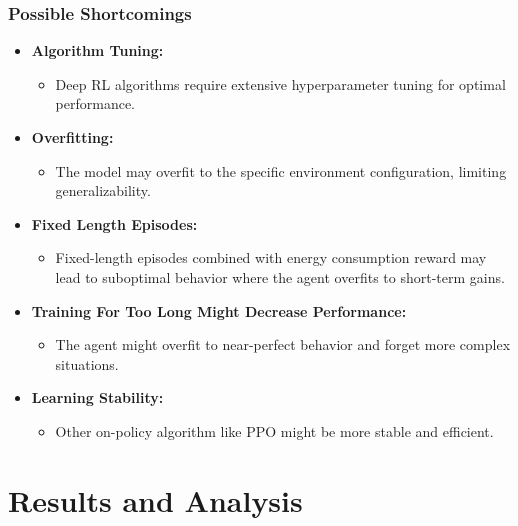 \documentclass{beamer}
\begin{document}
\begin{frame}
\frametitle{Possible Shortcomings}
\begin{itemize}
    \item \textbf{Algorithm Tuning:}
    \begin{itemize}
        \item Deep RL algorithms require extensive hyperparameter tuning for optimal performance.
    \end{itemize}
    \item \textbf{Overfitting:}
    \begin{itemize}
        \item The model may overfit to the specific environment configuration, limiting generalizability.
    \end{itemize}
    \item \textbf{Fixed Length Episodes:}
    \begin{itemize}
        \item Fixed-length episodes combined with energy consumption reward may lead to suboptimal behavior where the agent overfits to short-term gains.
    \end{itemize}
    \item \textbf{Training For Too Long Might Decrease Performance:}
    \begin{itemize}
        \item The agent might overfit to near-perfect behavior and forget more complex situations.
    \end{itemize}
    \item \textbf{Learning Stability:}
    \begin{itemize}
        \item Other on-policy algorithm like PPO might be more stable and efficient.
    \end{itemize}
\end{itemize}
\end{frame}

\section{Results and Analysis}
\end{document}
